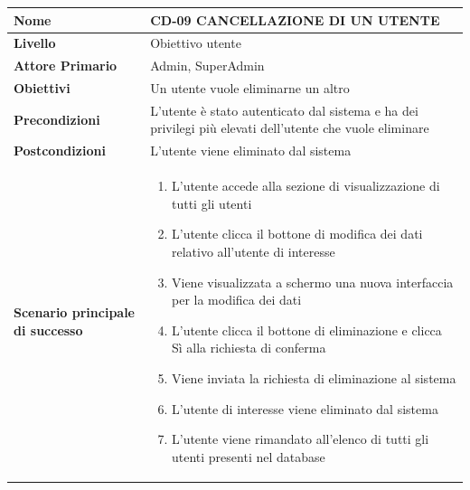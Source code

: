 \begin{center}
    \begin{tabular}{|p{0.3\linewidth}|p{0.7\linewidth}|}
    \hline
    \rowcolor{Blue}
    \textbf{Nome} & CD-09 CANCELLAZIONE DI UN UTENTE \\
    \hline
    \rowcolor{DarkBlue}
    \textbf{Livello} & Obiettivo utente \\
    \hline
    \rowcolor{LightBlue}
    \textbf{Attore Primario} & Admin, SuperAdmin \\
    \hline
    \rowcolor{LightBlue}
    \textbf{Obiettivi} & Un utente vuole eliminarne un altro \\
    \hline
    \rowcolor{Blue}
    \textbf{Precondizioni} & L’utente è stato autenticato dal sistema e ha dei privilegi più elevati dell’utente che vuole eliminare \\
    \hline
    \rowcolor{LightBlue}
    \textbf{Postcondizioni} & L’utente viene eliminato dal sistema \\
    \hline
    \rowcolor{LighterBlue}
        \begin{center}
        \textbf{Scenario principale di successo}
    \end{center} 
    & 
    \begin{enumerate}
        \item L’utente accede alla sezione di visualizzazione di tutti gli utenti
        \item L’utente clicca il bottone di modifica dei dati relativo all’utente di interesse
        \item Viene visualizzata a schermo una nuova interfaccia per la modifica dei dati
        \item L’utente clicca il bottone di eliminazione e clicca Sì alla richiesta di conferma
        \item Viene inviata la richiesta di eliminazione al sistema
        \item L’utente di interesse viene eliminato dal sistema
        \item L’utente viene rimandato all’elenco di tutti gli utenti presenti nel database
    \end{enumerate}
    \\
    \hline
    \end{tabular}
\end{center}

